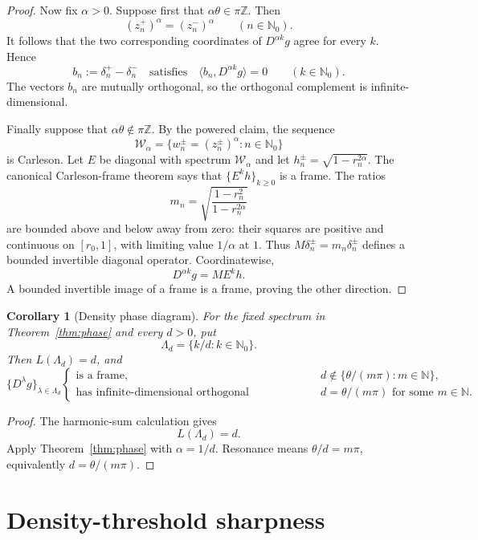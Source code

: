 \documentclass[11pt]{article}
\newtheorem{corollary}[theorem]{Corollary}
\theoremstyle{definition}
\newcommand{\N}{\mathbb N}
\begin{document}
\begin{proof}
Now fix \(\alpha>0\).  Suppose first that
\(\alpha\theta\in\pi\mathbb Z\).  Then
\[
 (z_n^+)^\alpha=(z_n^-)^\alpha
 \qquad(n\in\N_0).
\]
It follows that the two corresponding coordinates of \(D^{\alpha k}g\)
agree for every \(k\).  Hence
\[
 b_n:=\delta_n^+-\delta_n^-
 \quad\text{satisfies}\quad
 \langle b_n,D^{\alpha k}g\rangle=0
 \qquad(k\in\N_0).
\]
The vectors \(b_n\) are mutually orthogonal, so the orthogonal complement
is infinite-dimensional.

Finally suppose that \(\alpha\theta\notin\pi\mathbb Z\).  By the powered
claim, the sequence
\[
 \mathcal W_\alpha
 =\{w_n^\pm=(z_n^\pm)^\alpha:n\in\N_0\}
\]
is Carleson.  Let \(E\) be diagonal with spectrum \(\mathcal W_\alpha\)
and let \(h_n^\pm=\sqrt{1-r_n^{2\alpha}}\).  The canonical Carleson-frame
theorem \cite[Theorem~1.1]{CHPS} says that
\(\{E^kh\}_{k\ge0}\) is a frame.  The ratios
\[
 m_n
 =\sqrt{\frac{1-r_n^2}{1-r_n^{2\alpha}}}
\]
are bounded above and below away from zero: their squares are positive
and continuous on \([r_0,1]\), with limiting value \(1/\alpha\) at \(1\).
Thus \(M\delta_n^\pm=m_n\delta_n^\pm\) defines a bounded invertible
diagonal operator.  Coordinatewise,
\[
 D^{\alpha k}g=M E^kh.
\]
A bounded invertible image of a frame is a frame, proving the other
direction.
\end{proof}

\begin{corollary}[Density phase diagram]\label{cor:phase-density}
For the fixed spectrum in Theorem~\ref{thm:phase} and every \(d>0\), put
\[
 \Lambda_d=\{k/d:k\in\N_0\}.
\]
Then \(L(\Lambda_d)=d\), and
\[
 \{D^\lambda g\}_{\lambda\in\Lambda_d}
 \begin{cases}
 \text{is a frame,}
   &d\notin\{\theta/(m\pi):m\in\N\},\\[1mm]
 \text{has infinite-dimensional orthogonal complement,}
   &d=\theta/(m\pi)\text{ for some }m\in\N.
 \end{cases}
\]
\end{corollary}

\begin{proof}
The harmonic-sum calculation gives
\[
 L(\Lambda_d)=d.
\]
Apply Theorem~\ref{thm:phase} with \(\alpha=1/d\).  Resonance means
\(\theta/d=m\pi\), equivalently \(d=\theta/(m\pi)\).
\end{proof}

\section{Density-threshold sharpness}
\end{document}
